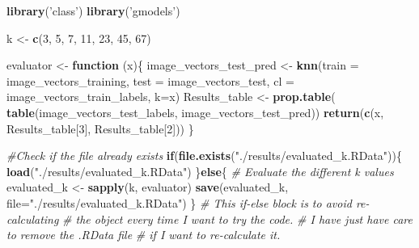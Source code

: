 \documentclass[]{article}
\newenvironment{Shaded}{\begin{snugshade}}{\end{snugshade}}
\newcommand{\KeywordTok}[1]{\textcolor[rgb]{0.13,0.29,0.53}{\textbf{#1}}}
\newcommand{\DataTypeTok}[1]{\textcolor[rgb]{0.13,0.29,0.53}{#1}}
\newcommand{\DecValTok}[1]{\textcolor[rgb]{0.00,0.00,0.81}{#1}}
\newcommand{\StringTok}[1]{\textcolor[rgb]{0.31,0.60,0.02}{#1}}
\newcommand{\CommentTok}[1]{\textcolor[rgb]{0.56,0.35,0.01}{\textit{#1}}}
\newcommand{\ControlFlowTok}[1]{\textcolor[rgb]{0.13,0.29,0.53}{\textbf{#1}}}
\newcommand{\NormalTok}[1]{#1}
\begin{document}
\begin{Shaded}
\begin{Highlighting}[]
\KeywordTok{library}\NormalTok{(}\StringTok{'class'}\NormalTok{)}
\KeywordTok{library}\NormalTok{(}\StringTok{'gmodels'}\NormalTok{)}

\NormalTok{k <-}\StringTok{ }\KeywordTok{c}\NormalTok{(}\DecValTok{3}\NormalTok{, }\DecValTok{5}\NormalTok{, }\DecValTok{7}\NormalTok{, }\DecValTok{11}\NormalTok{, }\DecValTok{23}\NormalTok{, }\DecValTok{45}\NormalTok{, }\DecValTok{67}\NormalTok{)}

\NormalTok{evaluator <-}\StringTok{ }\ControlFlowTok{function}\NormalTok{ (x)\{}
\NormalTok{  image_vectors_test_pred <-}\StringTok{ }\KeywordTok{knn}\NormalTok{(}\DataTypeTok{train =}\NormalTok{ image_vectors_training,}
                               \DataTypeTok{test =}\NormalTok{ image_vectors_test,}
                               \DataTypeTok{cl =}\NormalTok{ image_vectors_train_labels, }
                               \DataTypeTok{k=}\NormalTok{x)}
\NormalTok{  Results_table <-}\StringTok{ }\KeywordTok{prop.table}\NormalTok{(}
    \KeywordTok{table}\NormalTok{(image_vectors_test_labels,}
\NormalTok{          image_vectors_test_pred))}
  \KeywordTok{return}\NormalTok{(}\KeywordTok{c}\NormalTok{(x, Results_table[}\DecValTok{3}\NormalTok{], Results_table[}\DecValTok{2}\NormalTok{]))}
\NormalTok{\}}

\CommentTok{#Check if the file already exists}
\ControlFlowTok{if}\NormalTok{(}\KeywordTok{file.exists}\NormalTok{(}\StringTok{"./results/evaluated_k.RData"}\NormalTok{))\{}
  \KeywordTok{load}\NormalTok{(}\StringTok{"./results/evaluated_k.RData"}\NormalTok{)}
\NormalTok{\}}\ControlFlowTok{else}\NormalTok{\{}
\CommentTok{# Evaluate the different k values}
\NormalTok{  evaluated_k <-}\StringTok{ }\KeywordTok{sapply}\NormalTok{(k, evaluator)}
  \KeywordTok{save}\NormalTok{(evaluated_k, }\DataTypeTok{file=}\StringTok{"./results/evaluated_k.RData"}\NormalTok{)}
\NormalTok{\}}
\CommentTok{# This if-else block is to avoid re-calculating }
\CommentTok{# the object every time I want to try the code.}
\CommentTok{# I have just have care to remove the .RData file}
\CommentTok{# if I want to re-calculate it.}



\end{Highlighting}
\end{Shaded}
\end{document}
